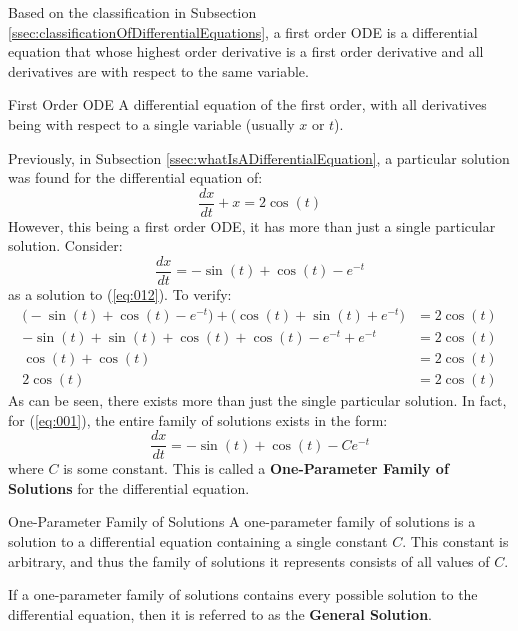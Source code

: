 \documentclass[12pt]{article}
\begin{document}
Based on the classification in Subsection \ref{ssec:classificationOfDifferentialEquations}, a first order ODE is a differential equation that whose highest order derivative is a first order derivative and all derivatives are with respect to the same variable.

\begin{definition}{First Order ODE}
  A differential equation of the first order, with all derivatives being with respect to a single variable (usually $x$ or $t$).
\end{definition}

Previously, in Subsection \ref{ssec:whatIsADifferentialEquation}, a particular solution was found for the differential equation of:
\begin{equation*}
  \frac{dx}{dt} + x = 2 \cos(t)
  \label{eq:012}
\end{equation*}
However, this being a first order ODE, it has more than just a single particular solution. Consider:
\begin{equation*}
  \frac{dx}{dt} = -\sin(t) + \cos(t) - e^{-t}
\end{equation*}
as a solution to (\ref{eq:012}). To verify:
\begin{align*}
  \big(-\sin(t) + \cos(t) - e^{-t}\big) + \big(\cos(t) + \sin(t) + e^{-t}\big) &= 2\cos(t) \\
  -\sin(t) + \sin(t) + \cos(t) + \cos(t) - e^{-t} + e^{-t} &= 2\cos(t) \\
  \cos(t) + \cos(t) &= 2\cos(t) \\
  2\cos(t) &= 2\cos(t)
\end{align*}
As can be seen, there exists more than just the single particular solution. In fact, for (\ref{eq:001}), the entire family of solutions exists in the form:
\begin{equation*}
  \frac{dx}{dt} = -\sin(t) + \cos(t) - Ce^{-t}
\end{equation*}
where $C$ is some constant. This is called a \textbf{One-Parameter Family of Solutions} for the differential equation.

\begin{definition}{One-Parameter Family of Solutions}
  A one-parameter family of solutions is a solution to a differential equation containing a single constant $C$. This constant is arbitrary, and thus the family of solutions it represents consists of all values of $C$.
\end{definition}

If a one-parameter family of solutions contains every possible solution to the differential equation, then it is referred to as the \textbf{General Solution}.
\end{document}
